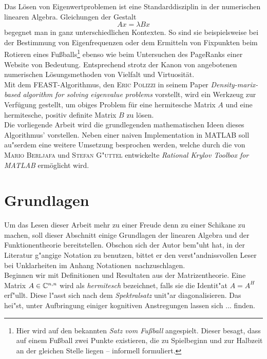 Das Lösen von Eigenwertproblemen ist eine Standarddisziplin in der
numerischen linearen Algebra. Gleichungen der Gestalt
\[
Ax = \lambda Bx
\]
begegnet man in ganz unterschiedlichen Kontexten. So sind sie beispielsweise
bei der Bestimmung von Eigenfrequenzen oder dem Ermitteln von Fixpunkten beim
Rotieren eines Fußballs\footnote{Hier wird auf den bekannten
\emph{Satz vom Fußball} angespielt. Dieser besagt, dass auf einem Fußball
zwei Punkte existieren, die zu Spielbeginn und zur Halbzeit
an der gleichen Stelle liegen -- informell formuliert.} ebenso wie beim
Untersuchen des PageRanks einer Website von
Bedeutung. Entsprechend strotz der Kanon von angebotenen numerischen
Lösungsmethoden von Vielfalt und Virtuosität.\\

Mit dem FEAST-Algorithmus, den \textsc{Eric Polizzi} in seinem Paper
\glqq\emph{Density-marix-based algorithm for solving eigenvalue problems}\grqq %
vorstellt, wird ein Werkzeug zur Verfügung gestellt, um obiges Problem
für eine hermitesche Matrix $A$ und eine hermitesche, positiv definite
Matrix $B$ zu lösen.\\

Die vorliegende Arbeit wird die grundlegenden mathematischen Ideen dieses Algorithmus'
vorstellen. Neben einer naiven Implementation in MATLAB soll au"serdem
eine weitere Umsetzung besprochen werden, welche durch die von
\textsc{Mario Berljafa} und \textsc{Stefan G"uttel} entwickelte
\glqq\emph{Rational Krylov Toolbox for MATLAB}\grqq %
ermöglicht wird.



\section{Grundlagen}

Um das Lesen dieser Arbeit mehr zu einer Freude denn zu einer Schikane zu
machen, soll dieser Abschnitt einige Grundlagen der linearen Algebra und
der Funktionentheorie bereitstellen. Obschon sich der Autor bem"uht hat,
in der Literatur g"angige Notation zu benutzen, bittet er den
verst"andnissvollen Leser bei Unklarheiten im Anhang \glqq Notationen\grqq\
nachzuschlagen.\\

Beginnen wir mit Definitionen und Resultaten aus der Matrizentheorie.
Eine Matrix $A\in\mathbb{C}^{n,n}$ wird als \emph{hermitesch} bezeichnet, falls
sie die Identit"at $A=A^H$ erf"ullt. Diese l"asst sich nach dem
\emph{Spektralsatz} unit"ar diagonalisieren. Das hei"st,
unter Aufbringung einiger kognitiven Anstregungen lassen sich ... finden.
